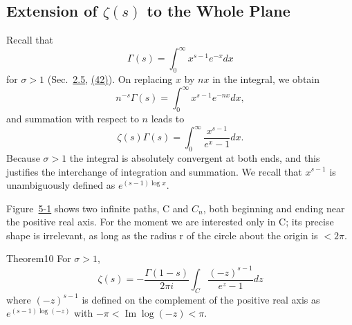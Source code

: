 \setcounter{section}{4}\setcounter{subsection}{1}\subsection{\texorpdfstring{Extension of $\zeta(s)$ to the Whole Plane}{Extension of ζ(s) to the Whole Plane}}\label{sec:5.4.2}
Recall that
\begin{equation*}
\Gamma (s) = \int_ {0} ^ {\infty} x ^ {s - 1} e ^ {- x} d x
\end{equation*}
for $\sigma > 1$ (Sec.~\hyperref[sec:5.2.5]{2.5}, \hyperref[eq:5.42]{(42)}). On replacing $x$ by $nx$ in the integral, we obtain
\begin{equation*}
n ^ {- s} \Gamma (s) = \int_ {0} ^ {\infty} x ^ {s - 1} e ^ {- n x} d x,
\end{equation*}
and summation with respect to $n$ leads to
\begin{equation*}
\zeta (s) \Gamma (s) = \int_ {0} ^ {\infty} \frac {x ^ {s - 1}}{e ^ {x} - 1} d x.\tag{58}\label{eq:5.58}
\end{equation*}
Because $\sigma > 1$ the integral is absolutely convergent at both ends, and this justifies the interchange of integration and summation. We recall that $x^{s-1}$ is unambiguously defined as $e^{(s-1)\log x}$.

Figure~\hyperref[fig:5-1]{5-1} shows two infinite paths, C and $C_{n}$, both beginning and ending near the positive real axis. For the moment we are interested only in C; its precise shape is irrelevant, as long as the radius r of the circle about the origin is $<2\pi$.

\begin{originalstatement}{Theorem}{10}\label{thm:5.10}
For $\sigma > 1$,
\begin{equation*}
\zeta (s) = - \frac {\Gamma (1 - s)}{2 \pi i} \int_ {C} \frac {(- z) ^ {s - 1}}{e ^ {z} - 1} d z\tag{59}\label{eq:5.59}
\end{equation*}
where $(-z)^{s-1}$ is defined on the complement of the positive real axis as $e^{(s-1)\log(-z)}$ with $-\pi < \operatorname{Im} \log(-z) < \pi$.

\end{originalstatement}

